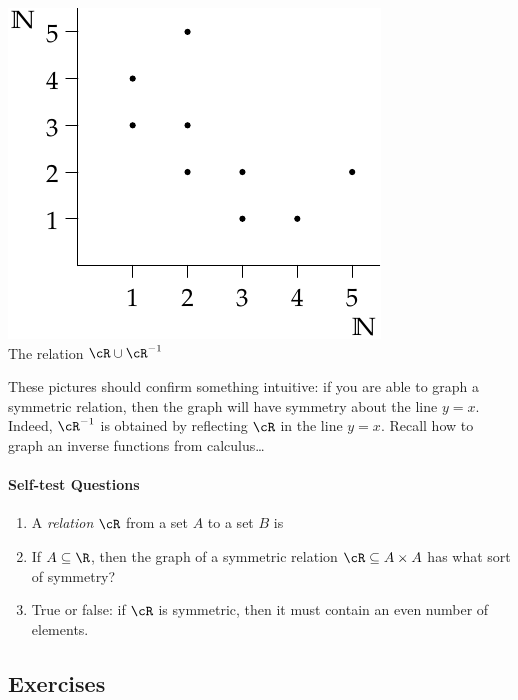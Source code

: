 \begin{center}
\begin{minipage}{0.35\textwidth}
\includegraphics[width=\textwidth]{relations-04-relnun}\\
The relation $\cR\cup \cR^{-1}$
\end{minipage}
\end{center}

\noindent These pictures should confirm something intuitive: if you are able to graph a symmetric relation, then the graph will have symmetry about the line $y=x$. Indeed, $\cR^{-1}$ is obtained by reflecting $\cR$ in the line $y=x$. Recall how to graph an inverse functions from calculus\ldots

\paragraph{Self-test Questions}

	\begin{enumerate}
    \item A \emph{relation} $\cR$ from a set $A$ to a set $B$ is \underline{\phantom{a subset of $A\times B$}\qquad\qquad} 
    \item If $A\subseteq\R$, then the graph of a symmetric relation $\cR\subseteq A\times A$ has what sort of symmetry?
    \item True or false: if $\cR$ is symmetric, then it must contain an even number of elements.
  \end{enumerate}

\subsection*{Exercises}

